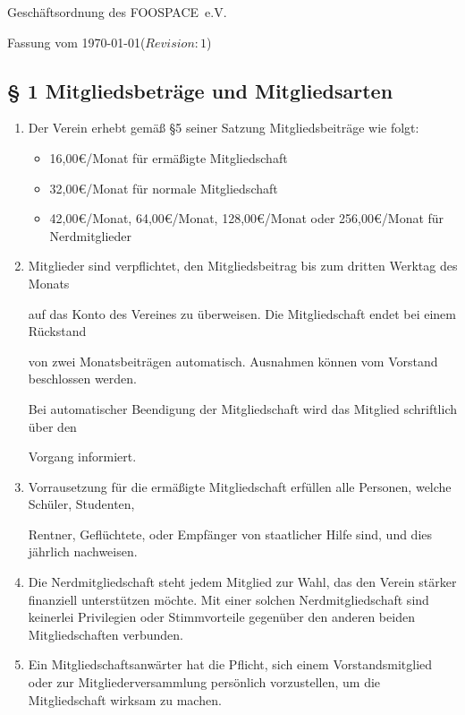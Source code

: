 \documentclass[10pt,a4paper]{article}
\newcommand{\name}{FOOSPACE}
\newcommand{\revision}{$Revision: 1$}
\begin{document}
{\LARGE Geschäftsordnung des \name\ e.V.}

Fassung vom \today (\revision)
%
%
\subsection*{§ 1 Mitgliedsbeträge und Mitgliedsarten}
\begin{enumerate}
\item Der Verein erhebt gemäß §5 seiner Satzung Mitgliedsbeiträge wie folgt:
    \begin{itemize}
    \item 16,00€/Monat für ermäßigte Mitgliedschaft
    \item 32,00€/Monat für normale Mitgliedschaft
    \item 42,00€/Monat, 64,00€/Monat, 128,00€/Monat oder 256,00€/Monat für Nerdmitglieder
    \end{itemize}
    

    \item Mitglieder sind verpflichtet, den Mitgliedsbeitrag bis zum dritten Werktag des Monats

    auf das Konto des Vereines zu überweisen. Die Mitgliedschaft endet bei einem Rückstand

    von zwei Monatsbeiträgen automatisch. Ausnahmen können vom Vorstand beschlossen werden.

    Bei automatischer Beendigung der Mitgliedschaft wird das Mitglied schriftlich über den

    Vorgang informiert.

    \item Vorrausetzung für die ermäßigte Mitgliedschaft erfüllen alle Personen, welche Schüler, Studenten,

    Rentner, Geflüchtete, oder Empfänger von staatlicher Hilfe sind, und dies jährlich nachweisen.

\item Die Nerdmitgliedschaft steht jedem Mitglied zur Wahl, das den Verein stärker
    finanziell unterstützen möchte. Mit einer solchen
    Nerdmitgliedschaft sind keinerlei Privilegien oder Stimmvorteile gegenüber
    den anderen beiden Mitgliedschaften verbunden.
    
    \item Ein Mitgliedschaftsanwärter hat die Pflicht, sich einem Vorstandsmitglied oder zur 
    Mitgliederversammlung persönlich vorzustellen, um die Mitgliedschaft wirksam zu machen.
    


\end{enumerate}
\end{document}
